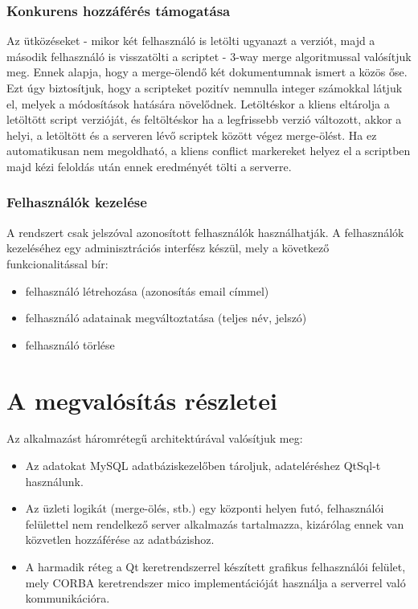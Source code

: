 \documentclass[a4paper,12pt]{article}
\begin{document}
\subsubsection{Konkurens hozzáférés támogatása}

Az ütközéseket - mikor két felhasználó is letölti ugyanazt a verziót, majd a
második felhasználó is visszatölti a scriptet - 3-way merge algoritmussal
valósítjuk meg. Ennek alapja, hogy a merge-ölendő két dokumentumnak ismert a
közös őse. Ezt úgy biztosítjuk, hogy a scripteket pozitív nemnulla integer
számokkal látjuk el, melyek a módosítások hatására növelődnek. Letöltéskor a
kliens eltárolja a letöltött script verzióját, és feltöltéskor ha a legfrissebb
verzió változott, akkor a helyi, a letöltött és a serveren lévő scriptek között
végez merge-ölést. Ha ez automatikusan nem megoldható, a kliens conflict
markereket helyez el a scriptben majd kézi feloldás után ennek eredményét tölti
a serverre.

\subsubsection{Felhasználók kezelése}

A rendszert csak jelszóval azonosított felhasználók használhatják. A
felhasználók kezeléséhez egy adminisztrációs interfész készül, mely a következő
funkcionalitással bír:

\begin{itemize}
\item felhasználó létrehozása (azonosítás email címmel)
\item felhasználó adatainak megváltoztatása (teljes név, jelszó)
\item felhasználó törlése
\end{itemize}

\section{A megvalósítás részletei}

Az alkalmazást háromrétegű architektúrával valósítjuk meg:

\begin{itemize}
\item Az adatokat MySQL adatbáziskezelőben tároljuk, adateléréshez QtSql-t használunk.
\item Az üzleti logikát (merge-ölés, stb.) egy központi helyen futó, felhasználói
felülettel nem rendelkező server alkalmazás tartalmazza, kizárólag ennek van
közvetlen hozzáférése az adatbázishoz.
\item A harmadik réteg a Qt keretrendszerrel készített grafikus felhasználói felület,
mely CORBA keretrendszer mico implementációját használja a serverrel való
kommunikációra.
\end{itemize}
\end{document}
